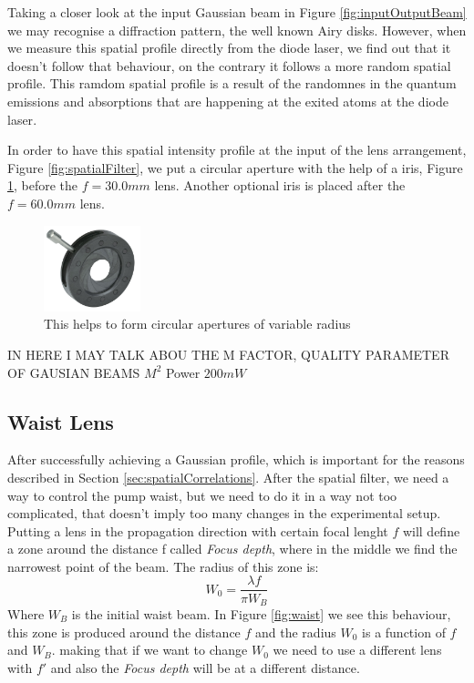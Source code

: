 Taking a closer look at the input Gaussian beam in Figure \ref{fig:inputOutputBeam} we may recognise a diffraction pattern, the well known Airy disks. 
However, when we measure this spatial profile directly from the diode laser, we find out that it doesn't follow that behaviour, on the contrary 
it follows a more random spatial profile. This ramdom spatial profile is a result of the randomnes in the
quantum emissions and absorptions that are happening at the exited atoms at the diode laser\cite{hecht}.

In order to have this spatial intensity profile at the input of the lens arrangement, Figure \ref{fig:spatialFilter},
we put a circular aperture with the help of a iris, Figure \ref{fig:iris}, before the $f=30.0 mm$ lens. Another optional iris is placed after the $f=60.0mm$ lens.
\begin{figure}[h!]
\centering
\includegraphics[width=0.25\textwidth]{Figures/iris.jpg}
\caption{This helps to form circular apertures of variable radius} 
\label{fig:iris}
\end{figure}


IN HERE I MAY TALK ABOU THE M FACTOR, QUALITY PARAMETER OF GAUSIAN BEAMS $M^2$ 
Power $200mW$

\subsection{Waist Lens}
After successfully achieving a Gaussian profile, which is important for the reasons described in Section \ref{sec:spatialCorrelations}.
After the spatial filter, we need a way to control the pump waist, but we need to do it in a way not too complicated, that 
doesn't imply too many changes in the experimental setup. Putting a  lens in the propagation direction with certain focal lenght $f$ will define a zone around
the distance f called \textit{Focus depth}\cite{hecht}, where in the middle we find the narrowest point of the beam.
The radius of this zone is:
\begin{equation}
 W_0=\frac{\lambda f}{\pi W_B}
\end{equation}
Where $W_B$ is the initial waist beam. 
In Figure \ref{fig:waist} we see this behaviour, this zone is produced around the distance $f$ and
the radius $W_0$ is a function of $f$ and $W_B$. making that if we want to change
$W_0$ we need to use a different lens with $f'$ and also the \textit{Focus depth}
will be at a different distance.

